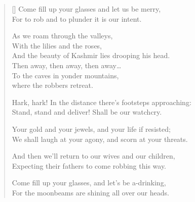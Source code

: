 \pagebreak
\settowidth{\versewidth}{Come fill up your glasses and let us be merry,}
\begin{verse}[\versewidth]
Come fill up your glasses and let us be merry,\\
For to rob and to plunder it is our intent.

\begin{chorus}
As we roam through the valleys,\\
With the lilies and the roses,\\
And the beauty of Kashmir lies drooping his head.\\
Then away, then away, then away\dots\\
To the caves in yonder mountains,\\
where the robbers retreat.
\end{chorus}

Hark, hark! In the distance there's footsteps approaching:\\
Stand, stand and deliver! Shall be our watchcry.

Your gold and your jewels, and your life if resisted;\\
We shall laugh at your agony, and scorn at your threats.

And then we'll return to our wives and our children,\\
Expecting their fathers to come robbing this way.

Come fill up your glasses, and let's be a-drinking,\\
For the moonbeams are shining all over our heads.




\attrib{}
\end{verse}
